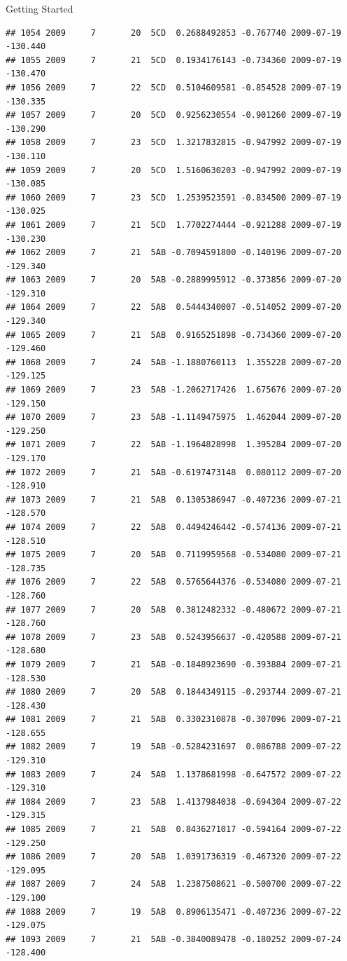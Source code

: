 \documentclass[
  ignorenonframetext,
]{beamer}
\begin{document}
\begin{frame}[fragile]{Getting Started}
\begin{verbatim}
## 1054 2009     7       20  5CD  0.2688492853 -0.767740 2009-07-19 -130.440
## 1055 2009     7       21  5CD  0.1934176143 -0.734360 2009-07-19 -130.470
## 1056 2009     7       22  5CD  0.5104609581 -0.854528 2009-07-19 -130.335
## 1057 2009     7       20  5CD  0.9256230554 -0.901260 2009-07-19 -130.290
## 1058 2009     7       23  5CD  1.3217832815 -0.947992 2009-07-19 -130.110
## 1059 2009     7       20  5CD  1.5160630203 -0.947992 2009-07-19 -130.085
## 1060 2009     7       23  5CD  1.2539523591 -0.834500 2009-07-19 -130.025
## 1061 2009     7       21  5CD  1.7702274444 -0.921288 2009-07-19 -130.230
## 1062 2009     7       21  5AB -0.7094591800 -0.140196 2009-07-20 -129.340
## 1063 2009     7       20  5AB -0.2889995912 -0.373856 2009-07-20 -129.310
## 1064 2009     7       22  5AB  0.5444340007 -0.514052 2009-07-20 -129.340
## 1065 2009     7       21  5AB  0.9165251898 -0.734360 2009-07-20 -129.460
## 1068 2009     7       24  5AB -1.1880760113  1.355228 2009-07-20 -129.125
## 1069 2009     7       23  5AB -1.2062717426  1.675676 2009-07-20 -129.150
## 1070 2009     7       23  5AB -1.1149475975  1.462044 2009-07-20 -129.250
## 1071 2009     7       22  5AB -1.1964828998  1.395284 2009-07-20 -129.170
## 1072 2009     7       21  5AB -0.6197473148  0.080112 2009-07-20 -128.910
## 1073 2009     7       21  5AB  0.1305386947 -0.407236 2009-07-21 -128.570
## 1074 2009     7       22  5AB  0.4494246442 -0.574136 2009-07-21 -128.510
## 1075 2009     7       20  5AB  0.7119959568 -0.534080 2009-07-21 -128.735
## 1076 2009     7       22  5AB  0.5765644376 -0.534080 2009-07-21 -128.760
## 1077 2009     7       20  5AB  0.3812482332 -0.480672 2009-07-21 -128.760
## 1078 2009     7       23  5AB  0.5243956637 -0.420588 2009-07-21 -128.680
## 1079 2009     7       21  5AB -0.1848923690 -0.393884 2009-07-21 -128.530
## 1080 2009     7       20  5AB  0.1844349115 -0.293744 2009-07-21 -128.430
## 1081 2009     7       21  5AB  0.3302310878 -0.307096 2009-07-21 -128.655
## 1082 2009     7       19  5AB -0.5284231697  0.086788 2009-07-22 -129.310
## 1083 2009     7       24  5AB  1.1378681998 -0.647572 2009-07-22 -129.310
## 1084 2009     7       23  5AB  1.4137984038 -0.694304 2009-07-22 -129.315
## 1085 2009     7       21  5AB  0.8436271017 -0.594164 2009-07-22 -129.250
## 1086 2009     7       20  5AB  1.0391736319 -0.467320 2009-07-22 -129.095
## 1087 2009     7       24  5AB  1.2387508621 -0.500700 2009-07-22 -129.100
## 1088 2009     7       19  5AB  0.8906135471 -0.407236 2009-07-22 -129.075
## 1093 2009     7       21  5AB -0.3840089478 -0.180252 2009-07-24 -128.400

\end{verbatim}
\end{frame}
\end{document}
